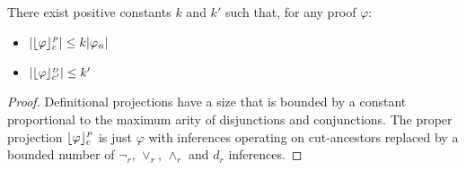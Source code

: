\begin{theorem}
\label{theorem:SizeOfCEResDProjections}
There exist positive constants $k$ and $k'$ such that, for any proof $\varphi$:
\begin{itemize}
\item $\proofsizeSymbol{\projectionProper{\varphi}{c}} \leq k \proofsizeSymbol{\varphi_n}$
\item $\proofsizeSymbol{\projectionDefinitional{\varphi}{c'}} \leq k'$
\end{itemize}
\end{theorem}
\begin{proof}
Definitional projections have a size that is bounded by a constant proportional to the maximum arity of disjunctions and conjunctions. The proper projection $\projectionProper{\varphi}{c}$ is just $\varphi$ with inferences operating on cut-ancestors replaced by a bounded number of $\neg_r$, $\vee_r$, $\wedge_r$ and $d_r$ inferences.
\hfill\QED
\end{proof}

